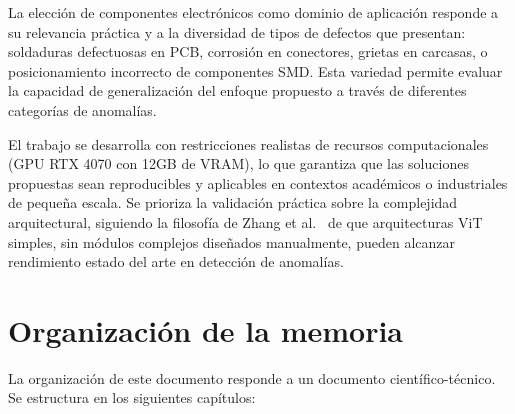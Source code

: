 La elección de componentes electrónicos como dominio de aplicación responde a su relevancia práctica y a la diversidad de tipos de defectos que presentan: soldaduras defectuosas en \acrlong{PCB}, corrosión en conectores, grietas en carcasas, o posicionamiento incorrecto de componentes \acrlong{SMD}. Esta variedad permite evaluar la capacidad de generalización del enfoque propuesto a través de diferentes categorías de anomalías.

El trabajo se desarrolla con restricciones realistas de recursos computacionales (\acrshort{GPU} RTX 4070 con 12GB de \acrshort{VRAM}), lo que garantiza que las soluciones propuestas sean reproducibles y aplicables en contextos académicos o industriales de pequeña escala. Se prioriza la validación práctica sobre la complejidad arquitectural, siguiendo la filosofía de Zhang et al.~\cite{zhang2025exploring} de que arquitecturas \acrshort{ViT} simples, sin módulos complejos diseñados manualmente, pueden alcanzar rendimiento estado del arte en detección de anomalías.


\section{Organización de la memoria} 
\label{sec:organizacion-memoria}

La organización de este documento responde a un documento científico-técnico. Se estructura en los siguientes capítulos:

